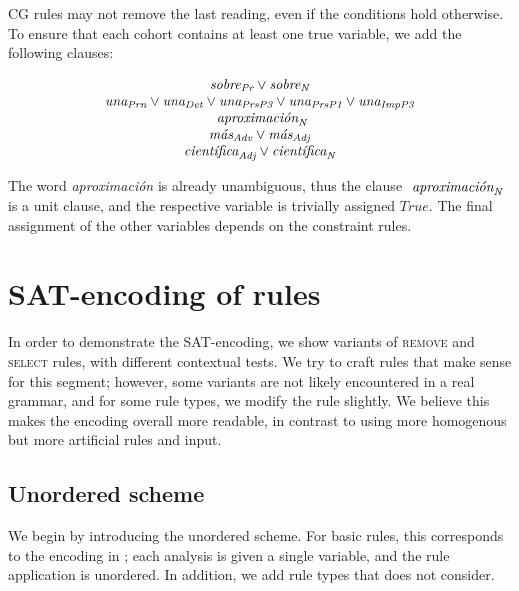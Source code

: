 \noindent CG rules may not remove the last reading, even if the conditions hold otherwise.
To ensure that each cohort contains at least one true variable, we add the following clauses:

\begin{equation}
\begin{array}{c}
\sobrePr \vee \sobreN \\
\unaPrn \vee \unaDet \vee \unaPrsPThree \vee \unaPrsPOne \vee \unaImp \\
\aproximacionN \\
\masAdv \vee \masAdj \\
\cientificaAdj \vee \cientificaN \\
\end{array}
\end{equation}

\noindent The word \emph{aproximación} is already unambiguous, thus the clause $\text{ \em aproximaci\'{o}n}_{\text{\em N}}$ is a unit clause, and the respective variable is trivially assigned $True$. 
The final assignment of the other variables depends on the constraint rules.

\section{SAT-encoding of rules}

In order to demonstrate the SAT-encoding, we show variants of \textsc{remove} and \textsc{select} rules, with different contextual tests. 
We try to craft rules that make sense for this segment; however, some variants are not likely encountered in a real grammar, and for some rule types, we modify the rule slightly. We believe this makes the encoding overall more readable, in contrast to using more homogenous but more artificial rules and input.


\subsection{Unordered scheme}

We begin by introducing the unordered scheme. For basic rules, this corresponds to the encoding in \cite{lager98}; each analysis is given a single variable, and the rule application is unordered. In addition, we add rule types that \cite{lager98} does not consider.

